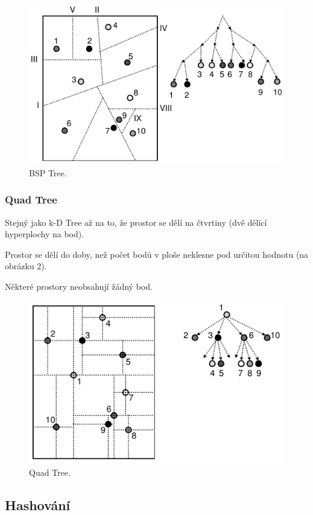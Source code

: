 \begin{figure}[H]
    \centering
    \includegraphics[width=0.75\linewidth]{bsp_tree.pdf}
    \caption{BSP Tree.}
\end{figure}

\subsubsection{Quad Tree}

\begin{compactitem}
    \item Stejný jako k-D Tree až na to, že prostor se dělí na čtvrtiny (dvě dělící hyperplochy na bod).
    \item Prostor se dělí do doby, než počet bodů v ploše neklesne pod určitou hodnotu (na obrázku 2).
    \item Některé prostory neobsahují žádný bod.
\end{compactitem}

\begin{figure}[H]
    \centering
    \includegraphics[width=0.75\linewidth]{quad_tree.pdf}
    \caption{Quad Tree.}
\end{figure}

\subsection{Hashování}


